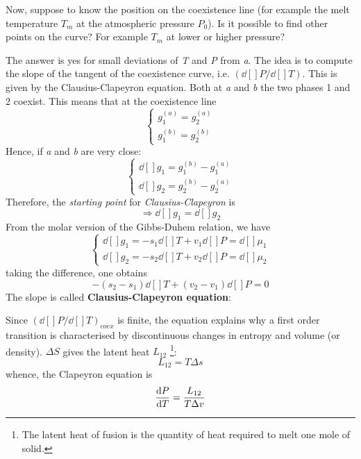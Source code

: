 \documentclass[../main/main.tex]{subfiles}
\begin{document}
Now, suppose to know the position on the coexistence line (for example the melt temperature \( T_m \) at the atmospheric pressure \( P_0 \)). Is it possible to find other points on the curve? For example \( T_m \) at lower or higher pressure?


The answer is yes for small deviations of \emph{T} and \emph{P} from \emph{a}. The idea is to compute the slope of the tangent of the coexistence curve, i.e. \( (\dd[]{P}/\dd[]{T}  )  \). This is given by the Clausius-Clapeyron equation.
Both at \emph{a} and \emph{b} the two phases 1 and 2 coexist. This means  that at the coexistence line
\begin{equation}
  \begin{cases}
   g_1^{(a)} = g_2^{(a)}\\
   g_1^{(b)} = g_2^{(b)}
  \end{cases}
\label{eq:}
\end{equation}
Hence, if \emph{a} and \emph{b} are very close:
\begin{equation}
  \begin{cases}
  \dd[]{g_1} = g_1^{(b)} - g_1^{(a)} \\
  \dd[]{g_2} = g_2^{(b)} - g_2^{(a)}
  \end{cases}
\label{eq:}
\end{equation}
Therefore, the \emph{starting point} for \emph{Clausius-Clapeyron} is
\begin{equation}
  \Rightarrow \dd[]{g_1} =\dd[]{g_2}
  \label{eq:}
\end{equation}
From the molar version of the Gibbs-Duhem relation, we have
\begin{equation}
  \begin{cases}
   \dd[]{g_1} = -s_1 \dd[]{T} + v_1 \dd[]{P} = \dd[]{\mu _1}    \\
   \dd[]{g_2} = -s_2 \dd[]{T} + v_2 \dd[]{P} = \dd[]{\mu _2}
  \end{cases}
\label{eq:}
\end{equation}
taking the difference, one obtains
\begin{equation*}
  -(s_2 - s_1) \dd[]{T} + (v_2 - v_1) \dd[]{P} = 0
\end{equation*}
The slope is called \textbf{Clausius-Clapeyron equation}:
\begin{remark}
Since \( (\dd[]{P}/\dd[]{T})_{coex}   \) is finite, the equation explains why a first order transition is characterised by discontinuous changes in entropy and volume (or density). \( \Delta S \)  gives the latent heat \( L_{12} \) \footnote{The latent heat of fusion is the quantity of heat required to melt one mole of solid.}:
\begin{equation}
  L_{12} = T \Delta s
\end{equation}
whence, the Clapeyron equation is
\begin{equation}
  \dv{P}{T}  = \frac{L_{12}}{T \Delta v}
\end{equation}
\end{remark}
\end{document}
